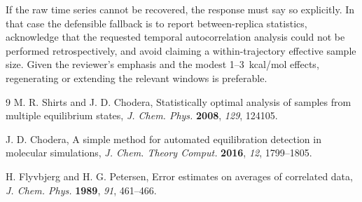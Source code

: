\documentclass[11pt,a4paper]{article}
\begin{document}
If the raw time series cannot be recovered, the response must say so explicitly. In that case the defensible fallback is to report between-replica statistics, acknowledge that the requested temporal autocorrelation analysis could not be performed retrospectively, and avoid claiming a within-trajectory effective sample size. Given the reviewer's emphasis and the modest 1--3~kcal/mol effects, regenerating or extending the relevant windows is preferable.

\begin{thebibliography}{9}
M. R. Shirts and J. D. Chodera,
Statistically optimal analysis of samples from multiple equilibrium states,
\emph{J. Chem. Phys.} \textbf{2008}, \emph{129}, 124105.

J. D. Chodera,
A simple method for automated equilibration detection in molecular simulations,
\emph{J. Chem. Theory Comput.} \textbf{2016}, \emph{12}, 1799--1805.

H. Flyvbjerg and H. G. Petersen,
Error estimates on averages of correlated data,
\emph{J. Chem. Phys.} \textbf{1989}, \emph{91}, 461--466.
\end{thebibliography}
\end{document}

